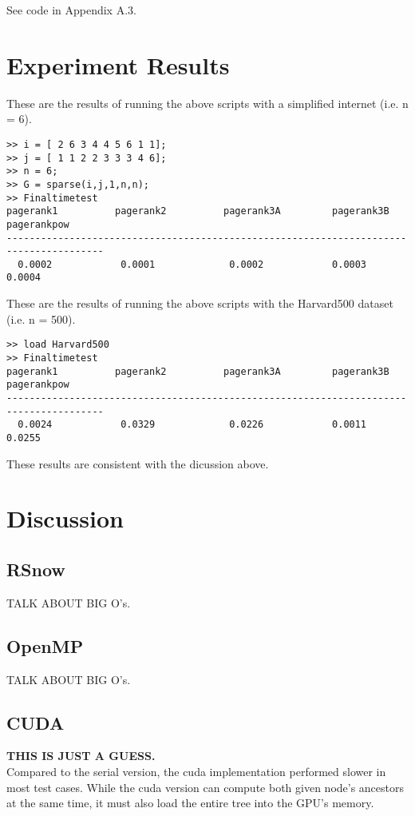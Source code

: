 \documentclass[11pt,letterpaper]{article}
\begin{document}
See code in Appendix A.3.\\

\section{Experiment Results}

These are the results of running the above scripts with a simplified internet (i.e.  n = 6).
\begin{verbatim}
>> i = [ 2 6 3 4 4 5 6 1 1];
>> j = [ 1 1 2 2 3 3 3 4 6];
>> n = 6;
>> G = sparse(i,j,1,n,n);
>> Finaltimetest
pagerank1          pagerank2          pagerank3A         pagerank3B        pagerankpow
---------------------------------------------------------------------------------------
  0.0002            0.0001             0.0002            0.0003            0.0004
\end{verbatim}
These are the results of running the above scripts with the Harvard500 dataset (i.e. n = 500).
\begin{verbatim}
>> load Harvard500
>> Finaltimetest
pagerank1          pagerank2          pagerank3A         pagerank3B        pagerankpow
---------------------------------------------------------------------------------------
  0.0024            0.0329             0.0226            0.0011            0.0255
\end{verbatim}

These results are consistent with the dicussion above. 

\section{Discussion}

\subsection{RSnow}
TALK ABOUT BIG O's.\\

\subsection{OpenMP}
TALK ABOUT BIG O's.\\

\subsection{CUDA}

\textbf{THIS IS JUST A GUESS.}\\ Compared to the serial version, the cuda implementation performed slower in most test cases. While the cuda version can compute both given node’s ancestors at the same time, it must also load the entire tree into the GPU’s memory.\\
\end{document}
